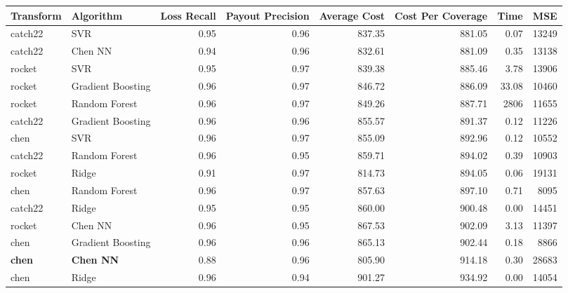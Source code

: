 \documentclass[11pt]{article}
\begin{document}
  \begin{table}
    \small
    \begin{tabular}{llrrrrrr}
      \toprule
      Transform &         Algorithm &  Loss Recall &  Payout Precision &  Average Cost &  Cost Per Coverage &    Time &      MSE \\
      \midrule
        catch22 &               SVR &         0.95 &              0.96 &        837.35 &             881.05 &    0.07 & 13249 \\
        catch22 &           Chen NN &         0.94 &              0.96 &        832.61 &             881.09 &    0.35 & 13138 \\
         rocket &               SVR &         0.95 &              0.97 &        839.38 &             885.46 &    3.78 & 13906 \\
         rocket & Gradient Boosting &         0.96 &              0.97 &        846.72 &             886.09 &   33.08 & 10460 \\
         rocket &     Random Forest &         0.96 &              0.97 &        849.26 &             887.71 &    2806 & 11655 \\
        catch22 & Gradient Boosting &         0.96 &              0.96 &        855.57 &             891.37 &    0.12 & 11226 \\
           chen &               SVR &         0.96 &              0.97 &        855.09 &             892.96 &    0.12 & 10552 \\
        catch22 &     Random Forest &         0.96 &              0.95 &        859.71 &             894.02 &    0.39 & 10903 \\
         rocket &             Ridge &         0.91 &              0.97 &        814.73 &             894.05 &    0.06 & 19131 \\
           chen &     Random Forest &         0.96 &              0.97 &        857.63 &             897.10 &    0.71 &  8095 \\
        catch22 &             Ridge &         0.95 &              0.95 &        860.00 &             900.48 &    0.00 & 14451 \\
         rocket &           Chen NN &         0.96 &              0.95 &        867.53 &             902.09 &    3.13 & 11397 \\
           chen & Gradient Boosting &         0.96 &              0.96 &        865.13 &             902.44 &    0.18 &  8866 \\
  \textbf{chen} &  \textbf{Chen NN} &         0.88 &              0.96 &        805.90 &             914.18 &    0.30 & 28683 \\
           chen &             Ridge &         0.96 &              0.94 &        901.27 &             934.92 &    0.00 & 14054 \\
      \bottomrule
      \end{tabular}
  \end{table}




  
\end{document}
